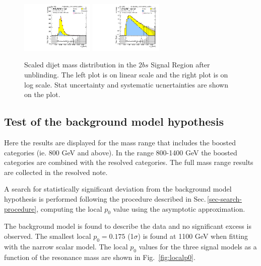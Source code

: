 \begin{figure}[htbp!]
\begin{center}
\includegraphics[width=0.31\textwidth,angle=-90]{figures/boosted/Signal_Syst/Moriond_bkg_9_TwoTag_split_Signal_mHH_pole.pdf}
\includegraphics[width=0.31\textwidth,angle=-90]{figures/boosted/Signal_Syst/Moriond_bkg_9_TwoTag_split_Signal_mHH_pole_1.pdf}  
  \caption{Scaled dijet mass distribution in the $2bs$ Signal Region after unblinding. The left plot is on linear scale and the right plot is on log scale. Stat uncertainty and systematic ucnertainties are shown on the plot.}
  \label{fig:boosted-2b-signal-pole}
\end{center}
\end{figure}

\subsection{Test of the background model hypothesis}

Here the results are displayed for the mass range that includes the boosted categories (ie. 800 GeV and above).  In the range 800-1400 GeV the boosted categories are combined with the resolved categories. The full mass range results are collected in the resolved note.

A search for statistically significant deviation from the background model hypothesis is performed following the procedure described in Sec.\,\ref{sec-search-procedure}, computing the local $p_0$ value using the asymptotic approximation.

The background model is found to describe the data and no significant excess is observed. The smallest local $p_0=0.175$ (1$\sigma$) is found at 1100 GeV when fitting with the narrow scalar model. The local $p_0$ values for the three signal models as a function of the resonance mass are shown in Fig.~\ref{fig:localp0}.

